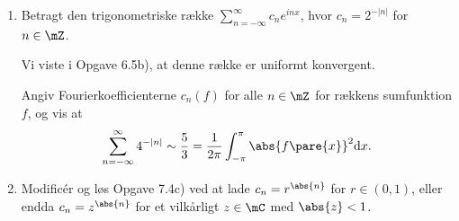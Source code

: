 \begin{opg}
\begin{enumerate}
	\item Betragt den trigonometriske række $\sum_{n=-\infty}^\infty c_n e^{in x}$, hvor $c_n = 2^{-|n|}$ for $n \in \mZ$. 
	
	Vi viste i Opgave 6.5b), at denne række er uniformt konvergent. 
	
	Angiv Fourierkoefficienterne $c_n(f)$ for alle $n \in \mZ$ for rækkens sumfunktion $f$, og vis at 
	$$ \sum_{n=-\infty}^\infty 4^{- \lvert n \rvert} \sim \frac{5}{3}
        = \frac{1}{2 \pi} \int_{-\pi}^\pi\abs{f\pare{x}}^2\mathrm{d}x. $$
    
    \iffalse\begin{proof}[Løsning]
    Vi har af MC 5.22, at Fourierkoefficienterne for $f$ er givet ved $c_n\pare{f} = 2^{-\abs{n}}$ for alle $n\in\mZ$. Vi får således af Parsevals identitet, at
    $$ \norm{f}_2^2 = \sum_{n=-\infty}^\infty \abs{2^{-\abs{n}}}^2
        = -1 + 2\sum_{n=0}^\infty 4^{-n} 
        \sim -1 + 2\cdot \frac{1}{1-\frac{1}{4}}
        = \frac{5}{3}, $$
    og vi husker, at $\norm{f}_2^2 = \frac{1}{2\pi}\int_{-\pi}^\pi \abs{f\pare{x}}^2 \, dx$.
    \end{proof}\fi
	
	\item Modificér og løs Opgave 7.4c) ved at lade $c_n = r^{\abs{n}}$ for $r \in (0,1)$, eller endda $c_n = z^{\abs{n}}$ for et vilkårligt $z\in\mC$ med $\abs{z} < 1$.
	
	\iffalse\begin{proof}[Løsning]
	Lad $z\in\mC$ og antag $\abs{z} < 1$. Da er rækken $\sum_{n=-\infty}^\infty z^{\abs{n}}$ ligeledes uniformt konvergent ved at argument svarende til det givne i Opgave 6.5d), hvorfor det følger af Parsevals identitet, at
	$$ \norm{f}_2^2 = \sum_{n=-\infty}^\infty \abs{z^{\abs{n}}}^2
        = -1 + 2\sum_{n=0}^\infty \abs{z}^n 
        \sim -1+2\cdot\frac{1}{1-\abs{z}} = \frac{1+\abs{z}}{1-\abs{z}}. $$
	\end{proof}\fi
\end{enumerate}
\end{opg}

